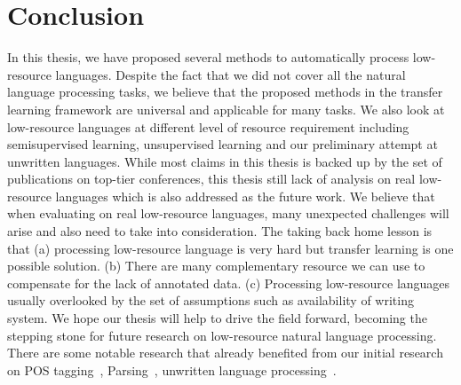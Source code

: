 \documentclass[12pt,twoside,final,hidelinks]{ltthesis}
\theoremstyle{definition}
\begin{document}
\section{Conclusion}
In this thesis, we have proposed several methods to automatically process low-resource languages. Despite the fact that we did not cover all the natural language 
processing tasks, we believe that the proposed methods in the transfer learning framework are universal and applicable for many tasks. We also look at low-resource
languages at different level of resource requirement including semisupervised learning, unsupervised learning and our preliminary attempt at unwritten languages. 
While most claims in this thesis is backed up by the set of publications on top-tier conferences, this thesis still lack of analysis on real low-resource 
languages which is also addressed as the future work. We believe that when evaluating on real low-resource languages, many unexpected challenges will arise and also 
need to take into consideration. 
The taking back home lesson is that (a) processing low-resource language is very hard but transfer learning is one possible solution. (b) There are many complementary resource we can use to compensate for the lack of annotated data. (c) Processing low-resource languages usually overlooked by the set of assumptions 
such as availability of writing system. 
We hope our thesis will help to drive the field forward, becoming the stepping stone for future research on low-resource natural language processing. There are some
notable research that already benefited from our initial research on POS tagging~\cite{DBLP:conf/conll/FangC16,Pecheux2016,zhang-EtAl:2016:N16-13,bacskaya2016semi}, Parsing~\cite{DBLP:journals/corr/GillickBVS15,Guo:2016:RLF:3016100.3016284,TACL892,DBLP:journals/corr/GuoCWL16,ledbetter-dickinson:2016:BEA11,TACL917}, unwritten language processing~\cite{DBLP:journals/corr/BansalKGL16,adams-EtAl:2016:EMNLP2016,anastasopoulos-chiang-duong:2016:EMNLP2016,Wilkinson+2016}. 

\end{document}
